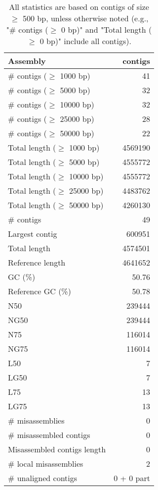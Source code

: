 \documentclass[12pt,a4paper]{article}
\begin{document}
\begin{table}[ht]
\begin{center}
\caption{All statistics are based on contigs of size $\geq$ 500 bp, unless otherwise noted (e.g., "\# contigs ($\geq$ 0 bp)" and "Total length ($\geq$ 0 bp)" include all contigs).}
\begin{tabular}{|l*{1}{|r}|}
\hline
Assembly & contigs \\ \hline
\# contigs ($\geq$ 1000 bp) & 41 \\ \hline
\# contigs ($\geq$ 5000 bp) & 32 \\ \hline
\# contigs ($\geq$ 10000 bp) & 32 \\ \hline
\# contigs ($\geq$ 25000 bp) & 28 \\ \hline
\# contigs ($\geq$ 50000 bp) & 22 \\ \hline
Total length ($\geq$ 1000 bp) & 4569190 \\ \hline
Total length ($\geq$ 5000 bp) & 4555772 \\ \hline
Total length ($\geq$ 10000 bp) & 4555772 \\ \hline
Total length ($\geq$ 25000 bp) & 4483762 \\ \hline
Total length ($\geq$ 50000 bp) & 4260130 \\ \hline
\# contigs & 49 \\ \hline
Largest contig & 600951 \\ \hline
Total length & 4574501 \\ \hline
Reference length & 4641652 \\ \hline
GC (\%) & 50.76 \\ \hline
Reference GC (\%) & 50.78 \\ \hline
N50 & 239444 \\ \hline
NG50 & 239444 \\ \hline
N75 & 116014 \\ \hline
NG75 & 116014 \\ \hline
L50 & 7 \\ \hline
LG50 & 7 \\ \hline
L75 & 13 \\ \hline
LG75 & 13 \\ \hline
\# misassemblies & 0 \\ \hline
\# misassembled contigs & 0 \\ \hline
Misassembled contigs length & 0 \\ \hline
\# local misassemblies & 2 \\ \hline
\# unaligned contigs & 0 + 0 part \\ \hline

\end{tabular}
\end{center}
\end{table}
\end{document}
